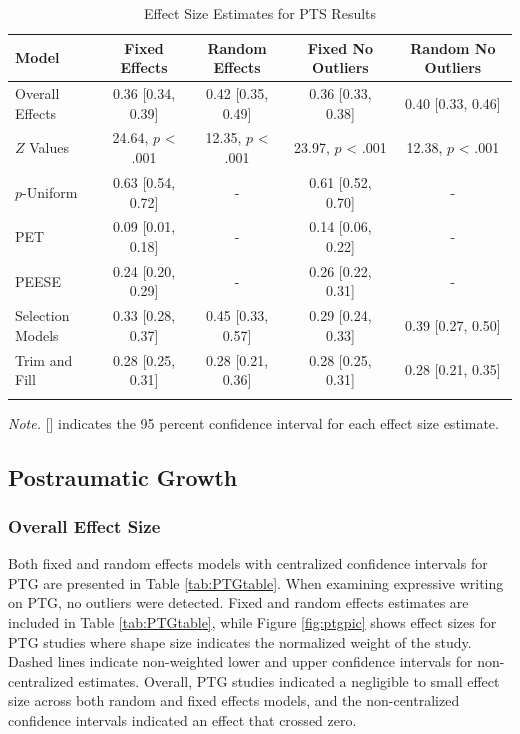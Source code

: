 \documentclass[man]{apa6}
\theoremstyle{definition}
\theoremstyle{definition}
\theoremstyle{definition}
\theoremstyle{remark}
\begin{document}
\begin{table}[tbp]
\begin{center}
\begin{threeparttable}
\caption{\label{tab:PTStable}Effect Size Estimates for PTS Results}
\small{
\begin{tabular}{lcccc}
\toprule
Model & Fixed Effects & Random Effects & Fixed No Outliers & Random No Outliers\\
\midrule
Overall Effects & 0.36 [0.34, 0.39] & 0.42 [0.35, 0.49] & 0.36 [0.33, 0.38] & 0.40 [0.33, 0.46]\\
$Z$ Values & 24.64, $p$ < .001 & 12.35, $p$ < .001 & 23.97, $p$ < .001 & 12.38, $p$ < .001\\
$p$-Uniform & 0.63 [0.54, 0.72] & - & 0.61 [0.52, 0.70] & -\\
PET & 0.09 [0.01, 0.18] & - & 0.14 [0.06, 0.22] & -\\
PEESE & 0.24 [0.20, 0.29] & - & 0.26 [0.22, 0.31] & -\\
Selection Models & 0.33 [0.28, 0.37] & 0.45 [0.33, 0.57] & 0.29 [0.24, 0.33] & 0.39 [0.27, 0.50]\\
Trim and Fill & 0.28 [0.25, 0.31] & 0.28 [0.21, 0.36] & 0.28 [0.25, 0.31] & 0.28 [0.21, 0.35]\\
\bottomrule
\addlinespace
\end{tabular}
}
\begin{tablenotes}[para]
\textit{Note.} [] indicates the 95 percent confidence interval for each effect size estimate.
\end{tablenotes}
\end{threeparttable}
\end{center}
\end{table}

\subsection{Postraumatic Growth}\label{postraumatic-growth}

\subsubsection{Overall Effect Size}\label{overall-effect-size-1}

Both fixed and random effects models with centralized confidence
intervals for PTG are presented in Table \ref{tab:PTGtable}. When
examining expressive writing on PTG, no outliers were detected. Fixed
and random effects estimates are included in Table \ref{tab:PTGtable},
while Figure \ref{fig:ptgpic} shows effect sizes for PTG studies where
shape size indicates the normalized weight of the study. Dashed lines
indicate non-weighted lower and upper confidence intervals for
non-centralized estimates. Overall, PTG studies indicated a negligible
to small effect size across both random and fixed effects models, and
the non-centralized confidence intervals indicated an effect that
crossed zero.
\end{document}

